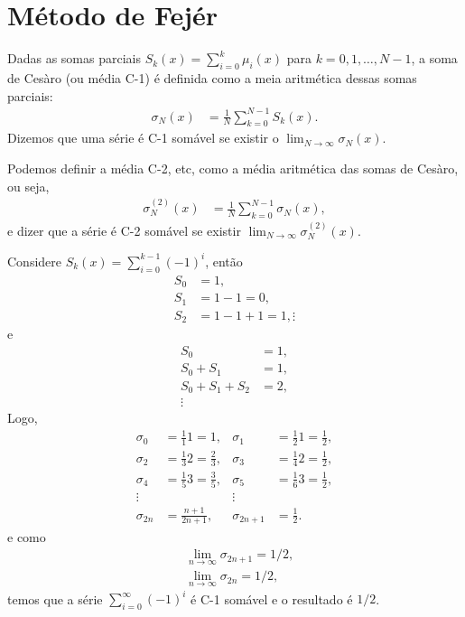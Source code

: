 \section{M\'{e}todo de Fej\'{e}r}
\begin{defi}
    Dadas as somas parciais $S_k(x) = \sum_{i = 0}^k \mu_i(x)$ para $k = 0, 1, \ldots, N - 1$, a soma de Ces\`{a}ro (ou m\'{e}dia C-1) \'{e} definida como a meia aritm\'{e}tica dessas somas parciais:
    \begin{align*}
        \sigma_N(x) &= \frac{1}{N} \sum_{k = 0}^{N - 1} S_k(x).
    \end{align*}
    Dizemos que uma s\'{e}rie \'{e} C-1 som\'{a}vel se existir o $\lim_{N \to \infty} \sigma_N(x)$.
\end{defi}
\begin{obs}
    Podemos definir a m\'{e}dia C-2, etc, como a m\'{e}dia aritm\'{e}tica das somas de Ces\`{a}ro, ou seja,
    \begin{align*}
        \sigma_N^{(2)}(x) &= \frac{1}{N} \sum_{k = 0}^{N - 1} \sigma_N(x),
    \end{align*}
    e dizer que a s\'{e}rie \'{e} C-2 som\'{a}vel se existir $\lim_{N \to \infty} \sigma_N^{(2)}(x)$.
\end{obs}
\begin{exem}
    Considere $S_k(x) = \sum_{i = 0}^{k - 1} (-1)^i$, ent\~{a}o
    \begin{align*}
        S_0 &= 1, \\
        S_1 &= 1 - 1 = 0, \\
        S_2 &= 1 - 1 + 1 = 1,
        \vdots
    \end{align*}
    e
    \begin{align*}
        S_0 &= 1, \\
        S_0 + S_1 &= 1, \\
        S_0 + S_1 + S_2 &= 2, \\
        \vdots
    \end{align*}
    Logo,
    \begin{align*}
        \sigma_0 &= \frac{1}{1} 1 = 1, & \sigma_1 &= \frac{1}{2} 1 = \frac{1}{2}, \\
        \sigma_2 &= \frac{1}{3} 2 = \frac{2}{3}, & \sigma_3 &= \frac{1}{4} 2 = \frac{1}{2}, \\
        \sigma_4 &= \frac{1}{5} 3 = \frac{3}{5}, & \sigma_5 &= \frac{1}{6} 3 = \frac{1}{2}, \\
        \vdots && \vdots \\
        \sigma_{2n} &= \frac{n + 1}{2n + 1}, & \sigma_{2n + 1} &= \frac{1}{2}.
    \end{align*}
    e como
    \begin{align*}
        & \lim_{n \to \infty} \sigma_{2n + 1} = 1/2, \\
        & \lim_{n \to \infty} \sigma_{2n} = 1/2,
    \end{align*}
    temos que a s\'{e}rie $\sum_{i = 0}^\infty (-1)^i$ \'{e} C-1 som\'{a}vel e o resultado \'{e} $1/2$.
\end{exem}
